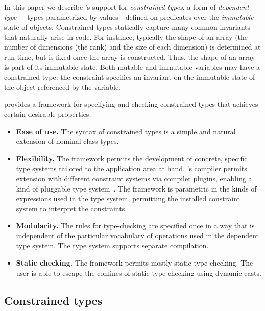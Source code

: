 In this paper we describe {\Xten}'s support for {\em
constrained types},
a form of {\em dependent
type}~\cite{dependent-types,xi99dependent,ocrz-ecoop03,aspinall-attapl,cayenne,epigram-matter,calc-constructions}---types parametrized by values---defined 
on predicates over the {\em immutable}
state of objects. Constrained types statically capture many common invariants
that naturally arise in code. For instance, typically the shape of an
array (the number of dimensions (the rank) and the size of each dimension)
is determined at
run time, but is fixed once the array is constructed. Thus, the shape of an
array is part of its immutable state.
Both mutable and immutable variables may have a constrained
type: the constraint specifies an invariant on the immutable state
of the object referenced by the variable. 

\Xten{} provides a framework for specifying and checking constrained types
that achieves certain desirable properties:
\begin{itemize}
\item 
{\bf Ease of use.}  
The syntax of constrained types is a simple and
natural extension of nominal class types.

\item
{\bf Flexibility.}
The framework
permits the development of concrete,
specific type systems tailored to the application area at
hand.  \Xten{}'s compiler permits extension with different constraint systems
via compiler plugins, enabling a kind of pluggable type system~\cite{bracha04-pluggable}.
The framework is parametric in the kinds of
expressions used in the type system, permitting the installed constraint
system to interpret the constraints.

\item
{\bf Modularity.}
The rules for type-checking
are specified once in a way that is independent of the
particular vocabulary of operations used in the dependent type
system.
The type system supports separate compilation.

\item
{\bf Static checking.}  The framework permits mostly static
type-checking. The user is able to escape the confines of
static type-checking using dynamic casts.
\end{itemize}

\subsection{Constrained types}

